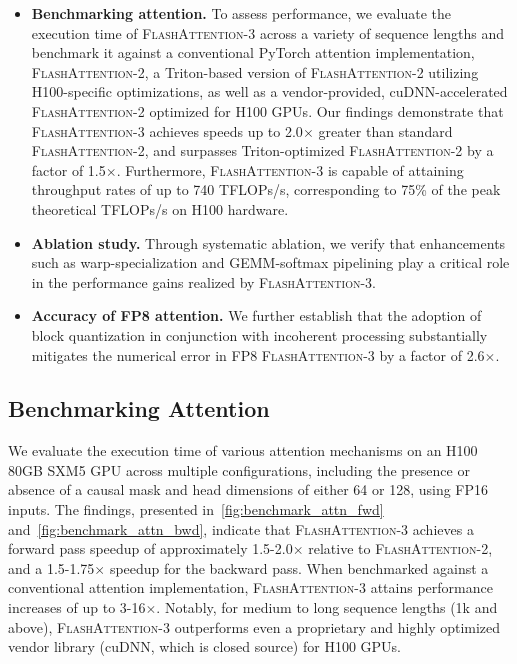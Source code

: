 \begin{itemize}

\item \textbf{Benchmarking attention.} To assess performance, we evaluate the execution time of \textsc{FlashAttention-3} across a variety of sequence lengths and benchmark it against a conventional PyTorch attention implementation, \textsc{FlashAttention-2}, a Triton-based version of \textsc{FlashAttention-2} utilizing H100-specific optimizations, as well as a vendor-provided, cuDNN-accelerated \textsc{FlashAttention-2} optimized for H100 GPUs. Our findings demonstrate that \textsc{FlashAttention-3} achieves speeds up to 2.0$\times$ greater than standard \textsc{FlashAttention-2}, and surpasses Triton-optimized \textsc{FlashAttention-2} by a factor of 1.5$\times$. Furthermore, \textsc{FlashAttention-3} is capable of attaining throughput rates of up to 740 TFLOPs/s, corresponding to 75\% of the peak theoretical TFLOPs/s on H100 hardware.

\item \textbf{Ablation study.} Through systematic ablation, we verify that enhancements such as warp-specialization and GEMM-softmax pipelining play a critical role in the performance gains realized by \textsc{FlashAttention-3}.

\item \textbf{Accuracy of FP8 attention.} We further establish that the adoption of block quantization in conjunction with incoherent processing substantially mitigates the numerical error in FP8 \textsc{FlashAttention-3} by a factor of 2.6$\times$.
\end{itemize}

\subsection{Benchmarking Attention}
\label{subsec:benchmark_attn}

We evaluate the execution time of various attention mechanisms on an H100 80GB SXM5 GPU across multiple configurations, including the presence or absence of a causal mask and head dimensions of either 64 or 128, using FP16 inputs. The findings, presented in~\cref{fig:benchmark_attn_fwd} and~\cref{fig:benchmark_attn_bwd}, indicate that \textsc{FlashAttention-3} achieves a forward pass speedup of approximately 1.5-2.0$\times$ relative to \textsc{FlashAttention-2}, and a 1.5-1.75$\times$ speedup for the backward pass. When benchmarked against a conventional attention implementation, \textsc{FlashAttention-3} attains performance increases of up to 3-16$\times$. Notably, for medium to long sequence lengths (1k and above), \textsc{FlashAttention-3} outperforms even a proprietary and highly optimized vendor library (cuDNN, which is closed source) for H100 GPUs.

